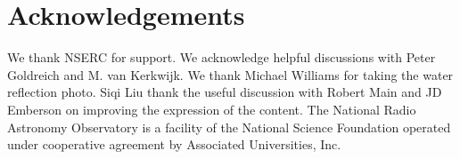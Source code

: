 \documentclass[useAMS,usenatbib]{mn2e}
\begin{document}
\section{Acknowledgements}

We thank NSERC for support. We acknowledge helpful discussions with
Peter Goldreich and M. van Kerkwijk. We thank Michael Williams for taking the water reflection photo.  Siqi Liu thank the useful discussion with Robert Main and JD Emberson on improving the expression of the content. 
The National Radio Astronomy Observatory is a facility of the National Science Foundation operated under cooperative agreement by Associated Universities, Inc.


\newcommand{\araa}{ARA\&A}   %
\newcommand{\afz}{Afz}       %
\newcommand{\aj}{AJ}         %
\newcommand{\azh}{AZh}       %
\newcommand{\aaa}{A\&A}      %
\newcommand{\aas}{A\&AS}     %
\newcommand{\aar}{A\&AR}     %
\newcommand{\apj}{ApJ}       %
\newcommand{\apjs}{ApJS}     %
\newcommand{\apjl}{ApJ}      %
\newcommand{\apss}{Ap\&SS}   %
\newcommand{\baas}{BAAS}     %
\newcommand{\jaa}{JA\&A}     %
\newcommand{\mnras}{MNRAS}   %
\newcommand{\nat}{Nat}       %
\newcommand{\pasj}{PASJ}     %
\newcommand{\pasp}{PASP}     %
\newcommand{\paspc}{PASPC}   %
\newcommand{\qjras}{QJRAS}   %
\newcommand{\sci}{Sci}       %
\newcommand{\solphys}{Solar Physics}       %
\newcommand{\sova}{SvA}      %
\newcommand{\aap}{A\&A}
\newcommand\jcap{{J. Cosmology Astropart. Phys.}}%
\newcommand{\prd}{Phys. Rev. D}






\label{lastpage}
\end{document}
